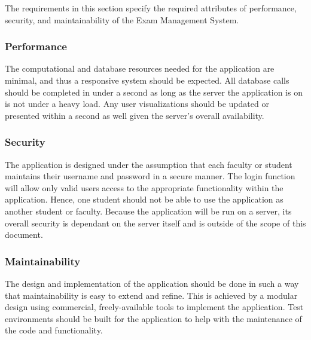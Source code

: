 
The requirements in this section specify the required attributes
 of performance,
security, and maintainability of the Exam Management System.

\subsubsection{Performance} 

The computational and database resources needed for the application are minimal,
and thus a responsive system should be expected. All database calls should be
completed in under a second as long as the server the application is on is not
under a heavy load. Any user visualizations should be updated or presented
within a second as well given the server's overall availability.

\subsubsection{Security} 

The application is designed under the assumption that each faculty or student
maintains their username and password in a secure manner. The login function
will allow only valid users access to the appropriate functionality within the
application. Hence, one student should not be able to use the application as
another student or faculty. Because the application will be run on a server,
its overall security is dependant on the server itself and is outside of the
scope of this document.

\subsubsection{Maintainability} 

The design and implementation of the application should be done in such a way
that maintainability is easy to extend and refine. This is achieved by a
modular design using commercial, freely-available tools to implement the
application. Test environments should be built for the application to help with
the maintenance of the code and functionality.

